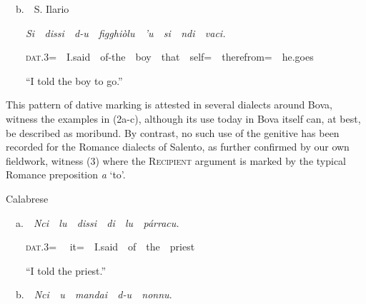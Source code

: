 \documentclass[output=paper,modfonts,nonflat]{langsci/langscibook}
\begin{document}
\begin{styleStandard}
\ \ b.\ \ S. Ilario
\end{styleStandard}

\begin{styleStandard}
\ \ \ \ \textit{Si\ \ dissi\ \ d-u\ \ figghiòlu\ \ ’u\ \ si\ \ ndi\ \ vaci. \ \ }
\end{styleStandard}

\begin{styleesempi}
\ \ \ \ \textsc{dat}.3=\ \ I.said\ \ of-the\ \ boy\ \ that\ \ self=\ \ therefrom=\ \ he.goes 
\end{styleesempi}

\begin{styleesempi}
\ \ \ \ “I told the boy to go.”
\end{styleesempi}

\begin{styleStandard}
This pattern of dative marking is attested in several dialects around Bova, witness the examples in (2a-c), although its use today in Bova itself can, at best, be described as moribund. By contrast, no such use of the genitive has been recorded for the Romance dialects of Salento, as further confirmed by our own fieldwork, witness (3) where the \textsc{Recipient} argument is marked by the typical Romance preposition \textit{a }‘to’.
\end{styleStandard}

\begin{listWWNumviiileveli}
\item 
\begin{styleListParagraph}
Calabrese\ \ 
\end{styleListParagraph}
\end{listWWNumviiileveli}
\begin{styleStandard}
\ \ a.\ \ \textit{Nci\ \ lu\ \ dissi\ \ di\ \ lu\ \ párracu.} 
\end{styleStandard}

\begin{styleStandard}
\ \ \ \ \textsc{dat}.3= \ \ it=\ \ I.said\ \ of\ \ the\ \ priest
\end{styleStandard}

\begin{styleStandard}
\ \ \ \ “I told the priest.”
\end{styleStandard}

\begin{styleStandard}
\ \ b.\ \ \textit{Nci\ \ u\ \ mandai\ \ d-u\ \ nonnu}.\ \ 
\end{styleStandard}
\end{document}
